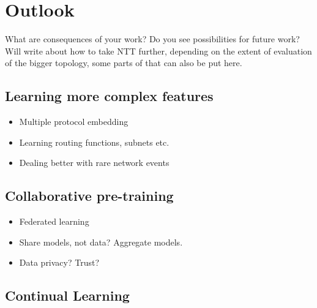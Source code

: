\chapter{Outlook}
\label{cha:outlook}

What are consequences of your work? Do you see possibilities for future work? Will write about how to take NTT further, depending on the extent of evaluation of the bigger topology, some parts of that can also be put here.

\section{Learning more complex features}
\label{sec:compfut}

\begin{itemize}
\item Multiple protocol embedding 
\item Learning routing functions, subnets etc.
\item Dealing better with rare network events
\end{itemize}

\section{Collaborative pre-training}
\label{sec:collab}

\begin{itemize}
\item Federated learning 
\item Share models, not data? Aggregate models.
\item Data privacy? Trust?
\end{itemize}

\section{Continual Learning}
\label{sec:cont}




